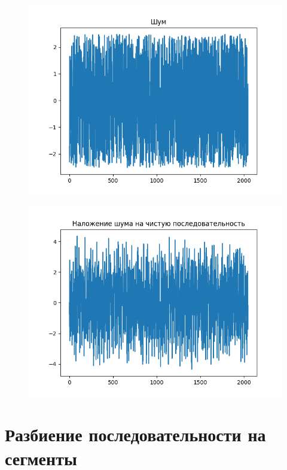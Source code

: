 \documentclass[12pt]{article}
\begin{document}
\begin{figure}[!htb]
\centering
\includegraphics[scale=1.00]{bad.png}
\caption{}
\label{}
\end{figure}

\begin{figure}[!htb]
\centering
\includegraphics[scale=1.00]{ugly.png}
\caption{}
\label{}
\end{figure}


\section{Разбиение последовательности на сегменты}
\end{document}
